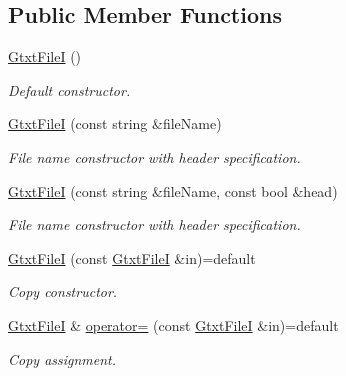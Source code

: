 \subsection*{Public Member Functions}
\begin{DoxyCompactItemize}
\item 
\mbox{\label{classsamp_files_1_1_gtxt_file_i_a4b125fb20371c9e97945ef7003165ee6}} 
\hyperlink{classsamp_files_1_1_gtxt_file_i_a4b125fb20371c9e97945ef7003165ee6}{Gtxt\+FileI} ()
\begin{DoxyCompactList}\small\item\em Default constructor. \end{DoxyCompactList}\item 
\hyperlink{classsamp_files_1_1_gtxt_file_i_aa41eb934d041edd06cee29d3e69f73da}{Gtxt\+FileI} (const string \&file\+Name)
\begin{DoxyCompactList}\small\item\em File name constructor with header specification. \end{DoxyCompactList}\item 
\hyperlink{classsamp_files_1_1_gtxt_file_i_a78dbd140e9f2e49d98c15c6360b0e88f}{Gtxt\+FileI} (const string \&file\+Name, const bool \&head)
\begin{DoxyCompactList}\small\item\em File name constructor with header specification. \end{DoxyCompactList}\item 
\mbox{\label{classsamp_files_1_1_gtxt_file_i_a55927f7c5eb0b1b10331d4e09cf265d7}} 
\hyperlink{classsamp_files_1_1_gtxt_file_i_a55927f7c5eb0b1b10331d4e09cf265d7}{Gtxt\+FileI} (const \hyperlink{classsamp_files_1_1_gtxt_file_i}{Gtxt\+FileI} \&in)=default
\begin{DoxyCompactList}\small\item\em Copy constructor. \end{DoxyCompactList}\item 
\mbox{\label{classsamp_files_1_1_gtxt_file_i_a6a0acfa7671ef2ab4a3405e23c9c33ec}} 
\hyperlink{classsamp_files_1_1_gtxt_file_i}{Gtxt\+FileI} \& \hyperlink{classsamp_files_1_1_gtxt_file_i_a6a0acfa7671ef2ab4a3405e23c9c33ec}{operator=} (const \hyperlink{classsamp_files_1_1_gtxt_file_i}{Gtxt\+FileI} \&in)=default
\begin{DoxyCompactList}\small\item\em Copy assignment. \end{DoxyCompactList}\item 

\end{DoxyCompactItemize}
